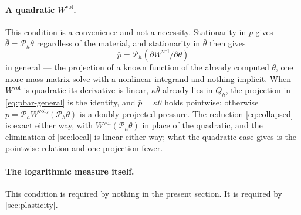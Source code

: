\documentclass{article}
\newcommand{\supvol}{^{\mathrm{vol}}}
\theoremstyle{definition}
\theoremstyle{plain}
\begin{document}
\paragraph{A quadratic $W\supvol$.} This condition is a convenience and not a
necessity. Stationarity in $\bar p$ gives $\bar\theta = \mathcal{P}_h\theta$ regardless of
the material, and stationarity in $\bar\theta$ then gives
\begin{equation}
  \label{eq:pbar-general}
  \bar p = \mathcal{P}_h\!\left(\partial W\supvol/\partial\bar\theta\right)
\end{equation}
in general --- the projection of a known function of the already
computed $\bar\theta$, one more mass-matrix solve with a nonlinear integrand
and nothing implicit. When $W\supvol$ is quadratic its derivative is linear,
$\kappa\bar\theta$ already lies in $Q_h$, the projection in
\eqref{eq:pbar-general} is the identity, and $\bar p = \kappa\bar\theta$ holds
pointwise; otherwise $\bar p = \mathcal{P}_h W\supvol{}'(\mathcal{P}_h\theta)$ is a
doubly projected pressure. The reduction \eqref{eq:collapsed} is exact either
way, with $W\supvol(\mathcal{P}_h\theta)$ in place of the quadratic, and the
elimination of \cref{sec:local} is linear either way; what the quadratic case
gives is the pointwise relation and one projection fewer.

\paragraph{The logarithmic measure itself.} This condition is required by
nothing in the present section. It is required by \cref{sec:plasticity}.
\end{document}
